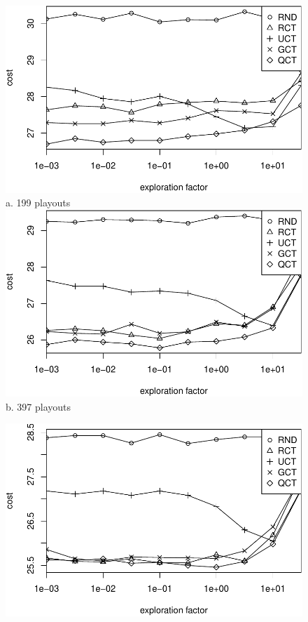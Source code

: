 \documentclass{article}
\begin{document}
\begin{figure}[ht]
  \begin{minipage}[b]{0.5\linewidth}
    \centering
    \includegraphics[scale=0.45]{costs-size=6-nsamples=199.pdf}\\
    a. 199 playouts\\
    \vspace{1em}
    \includegraphics[scale=0.45]{costs-size=6-nsamples=397.pdf}\\
    b. 397 playouts\\
  \end{minipage}
  \begin{minipage}[b]{0.5\linewidth}
    \centering
    \includegraphics[scale=0.45]{costs-size=6-nsamples=793.pdf}\\

\end{minipage}
\end{figure}
\end{document}
